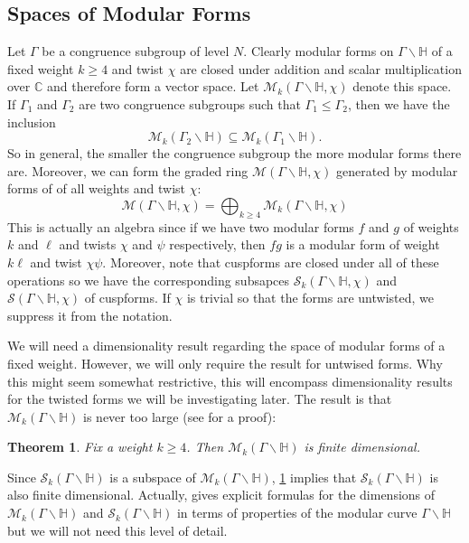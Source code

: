 \documentclass[12pt]{book}
\newtheorem{theorem}{Theorem}[section]
\theoremstyle{definition}\newframedtheorem{method}{Method}
\newcommand{\mc}{\mathcal}
\newcommand{\C}{\mathbb{C}}
\renewcommand{\H}{\mathbb{H}}
\newcommand{\G}{\Gamma}
\newcommand{\bigop}{\bigoplus}
\newcommand{\<}{\langle}
\renewcommand{\>}{\rangle}
\newcommand{\GH}{\G\backslash\H}
\begin{document}
    \subsection*{Spaces of Modular Forms}
      Let $\G$ be a congruence subgroup of level $N$. Clearly modular forms on $\GH$ of a fixed weight $k \ge 4$ and twist $\chi$ are closed under addition and scalar multiplication over $\C$ and therefore form a vector space. Let $\mc{M}_{k}(\GH,\chi)$ denote this space. If $\G_{1}$ and $\G_{2}$ are two congruence subgroups such that $\G_{1} \le \G_{2}$, then we have the inclusion
      \[
        \mc{M}_{k}(\G_{2}\backslash\H) \subseteq \mc{M}_{k}(\G_{1}\backslash\H).
      \]
      So in general, the smaller the congruence subgroup the more modular forms there are. Moreover, we can form the graded ring $\mc{M}(\GH,\chi)$ generated by modular forms of of all weights and twist $\chi$:
      \[
        \mc{M}(\GH,\chi) = \bigop_{k \ge 4}\mc{M}_{k}(\GH,\chi)
      \]
      This is actually an algebra since if we have two modular forms $f$ and $g$ of weights $k$ and $\ell$ and twists $\chi$ and $\psi$ respectively, then $fg$ is a modular form of weight $k\ell$ and twist $\chi\psi$. Moreover, note that cuspforms are closed under all of these operations so we have the corresponding subsapces $\mc{S}_{k}(\GH,\chi)$ and $\mc{S}(\GH,\chi)$ of cuspforms. If $\chi$ is trivial so that the forms are untwisted, we suppress it from the notation.

      We will need a dimensionality result regarding the space of modular forms of a fixed weight. However, we will only require the result for untwised forms. Why this might seem somewhat restrictive, this will encompass dimensionality results for the twisted forms we will be investigating later. The result is that $\mc{M}_{k}(\GH)$ is never too large (see \cite{diamond2005first} for a proof):

      \begin{theorem}\label{thm:modular_forms_space_classification}
        Fix a weight $k \ge 4$. Then $\mc{M}_{k}(\GH)$ is finite dimensional.
      \end{theorem}

      Since $\mc{S}_{k}(\GH)$ is a subspace of $\mc{M}_{k}(\GH)$, \cref{thm:modular_forms_space_classification} implies that $\mc{S}_{k}(\GH)$ is also finite dimensional. Actually, \cite{diamond2005first} gives explicit formulas for the dimensions of $\mc{M}_{k}(\GH)$ and $\mc{S}_{k}(\GH)$ in terms of properties of the modular curve $\GH$ but we will not need this level of detail.
\end{document}
